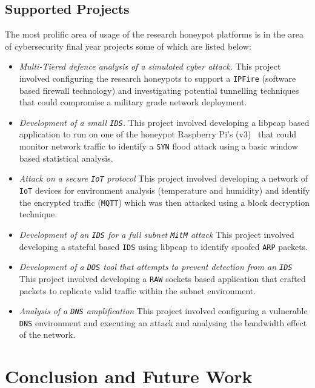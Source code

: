 \documentclass{llncs}
\begin{document}
\subsection{Supported Projects\label{Projects}}

The most prolific area of usage of the research honeypot platforms is in the
area of cybersecurity final year projects some of which are listed below:

\begin{itemize} 
  \item \noindent \emph{Multi-Tiered defence analysis of a simulated cyber
    attack.} This project involved configuring the research honeypots to
    support a \texttt{IPFire} (software based firewall technology) and
    investigating potential tunnelling techniques that could compromise a
    military grade network deployment.  
  \item \noindent \emph{Development of a small \texttt{IDS}.} This project
    involved developing a libpcap based application to run on one of the
    honeypot Raspberry Pi's (v3)~\cite{RASP:17} that could monitor network
    traffic to identify a \texttt{SYN} flood attack using a basic window based
    statistical analysis.  
    \item \noindent \emph{Attack on a secure \texttt{IoT} protocol} This
      project involved developing a network of \texttt{IoT} devices for
      environment analysis (temperature and humidity) and identify the
      encrypted traffic (\texttt{MQTT}) which was then attacked using a block
      decryption technique.  
    \item \noindent \emph{Development of an \texttt{IDS} for a full subnet
      \texttt{MitM} attack} This project involved developing a stateful based
      \texttt{IDS} using libpcap to identify spoofed \texttt{ARP} packets.  
    \item \noindent \emph{Development of a \texttt{DOS} tool that attempts to
      prevent detection from an \texttt{IDS}} This project involved developing
      a \texttt{RAW} sockets based application that crafted packets to
      replicate valid traffic within the subnet environment.  
     \item \noindent \emph{Analysis of a \texttt{DNS} amplification} This
       project involved configuring a vulnerable \texttt{DNS} environment and
       executing an attack and analysing the bandwidth effect of the network.
\end{itemize}

\section{Conclusion and Future Work\label{Future}}
\end{document}
